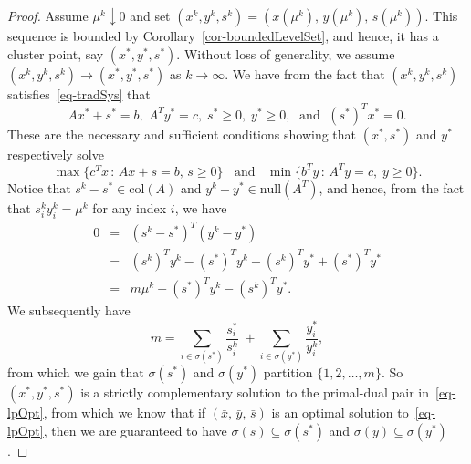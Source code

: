 \documentclass{article}
\def\xb{\bar{x}}
\def\yb{\bar{y}}
\def\sb{\bar{s}}
\begin{document}
\begin{proof}
Assume $\mu^k \downarrow 0$ and set 
$(x^k, y^k, s^k) = (x(\mu^k), \, y(\mu^k), \, s(\mu^k) )$.
This sequence is bounded by Corollary~\ref{cor-boundedLevelSet}, 
and hence, it has a cluster point, say $(x^*, y^*, s^*)$. Without loss 
of generality, we assume $(x^k, y^k, s^k) \rightarrow (x^*, y^*, s^*)$ 
as $k \rightarrow \infty$. We have from the fact that $(x^k, y^k, s^k)$ 
satisfies~\eqref{eq-tradSys} that
\[
Ax^* + s^* = b, \; A^T y^* = c, \; s^* \ge 0, \;  y^* \ge 0, \;
    \mbox{ and } \; (s^*)^T x^* = 0.
\]
These are the necessary and sufficient conditions showing 
that $(x^*, s^*)$ and $y^*$ respectively solve
\begin{equation} \label{eq-lpOpt}
\max \{ c^T x \, : \, Ax + s = b, \, s \ge 0 \}
\;\; \mbox{ and } \;\;
\min \{ b^T y \, : \, A^T y = c, \; y \ge 0 \}.
\end{equation}
Notice that $s^k - s^* \in \mbox{col}(A)$ and $y^k - y^* \in \mbox{null}(A^T)$,
and hence, from the fact that $s_i^k y_i^k = \mu^k$ for any index $i$, we have
\begin{eqnarray*}
0 & = & (s^k - s^*)^T (y^k - y^*) \\[4pt]
  & = & (s^k)^T y^k - (s^*)^T y^k - (s^k)^T y^* + (s^*)^T y^* \\[4pt]
  & = & m \mu^k - (s^*)^T y^k - (s^k)^T y^*.
\end{eqnarray*}
We subsequently have
\[
m = \sum_{i \in \sigma(s^*)} \frac{s^*_i}{s^k_i} 
    \; + \sum_{i \in \sigma(y^*)} \frac{y^*_i}{y^k_i},
\]
from which we gain that $\sigma(s^*)$ and $\sigma(y^*)$ partition
$\{1, 2, \ldots, m\}$. So $(x^*, y^*, s^*)$ is a strictly
complementary solution to the primal-dual pair in~\eqref{eq-lpOpt},
from which we know that if $(\xb, \, \yb, \, \sb)$ is an optimal 
solution to~\eqref{eq-lpOpt}, then we are guaranteed to have 
$\sigma(\sb) \subseteq \sigma(s^*)$ and
$\sigma(\yb) \subseteq \sigma(y^*)$.


\end{proof}
\end{document}
